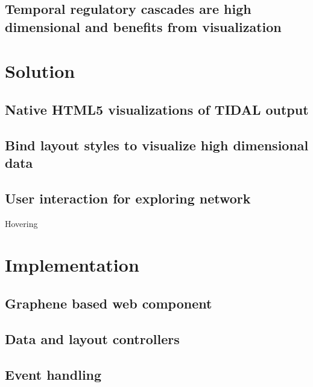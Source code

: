 \autocite{zaslavsky2013reconstruction}
\subsection{Temporal regulatory cascades are high dimensional and benefits from visualization}


\section{Solution}
\subsection{Native HTML5 visualizations of TIDAL output}
\subsection{Bind layout styles to visualize high dimensional data}
\subsection{User interaction for exploring network}
Hovering

\section{Implementation}
\subsection{Graphene based web component}
\subsection{Data and layout controllers}
\subsection{Event handling}
